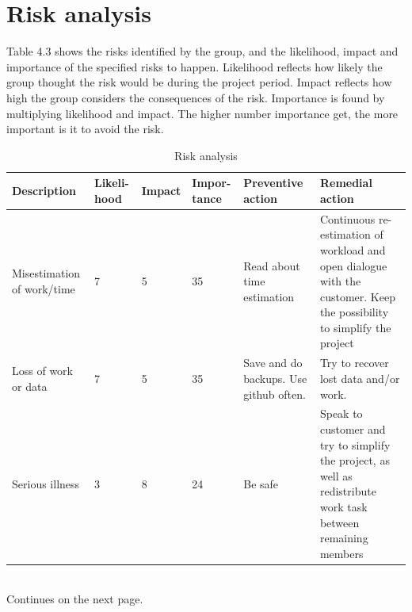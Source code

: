 \section{Risk analysis}
Table 4.3 shows the risks identified by the group, and the likelihood, impact and importance of the specified risks to happen. Likelihood reflects how likely the group thought the risk would be during the project period. Impact reflects how high the group considers the consequences of the risk. Importance is found by multiplying likelihood and impact. The higher number importance get, the more important is it to avoid the risk.

\begin{center}
\begin{table}[h]
\caption{Risk analysis}
\begin{tabular}{ | m{2.2cm} | m{1cm} | m{1.2cm} | m{1.2cm} | m{2cm} | m{2.2cm} | }
\hline
\textbf{Description} & \textbf{Likeli- hood} & \textbf{Impact} & \textbf{Impor- tance} & \textbf{Preventive action} & \textbf{Remedial action}\\
\hline
    Misestimation of work/time & 7 & 5 & 35 & Read about time estimation & Continuous re-estimation of workload and open dialogue with the customer. Keep the possibility to simplify the project\\
\hline
    Loss of work or data & 7 & 5 & 35 & Save and do backups. Use github often. & Try to recover lost data and/or work. \\ 
\hline
    Serious illness & 3 & 8 & 24 & Be safe & Speak to customer and try to simplify the project, as well as redistribute work task between remaining members\\
    \hline
    \end{tabular}\\
    Continues on the next page.
\end{table}
\end{center}

